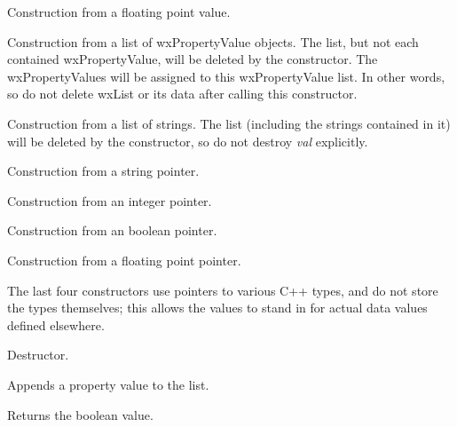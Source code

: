 
Construction from a floating point value.


Construction from a list of wxPropertyValue objects. The
list, but not each contained wxPropertyValue, will be deleted
by the constructor. The wxPropertyValues will be assigned to
this wxPropertyValue list. In other words, so do not delete wxList or
its data after calling this constructor.


Construction from a list of strings. The list (including the strings
contained in it) will be deleted by the constructor, so do not
destroy {\it val} explicitly.


Construction from a string pointer.


Construction from an integer pointer.


Construction from an boolean pointer.


Construction from a floating point pointer.

The last four constructors use pointers to various C++ types, and do not
store the types themselves; this allows the values to stand in for actual
data values defined elsewhere.



Destructor.



Appends a property value to the list.



Returns the boolean value.


